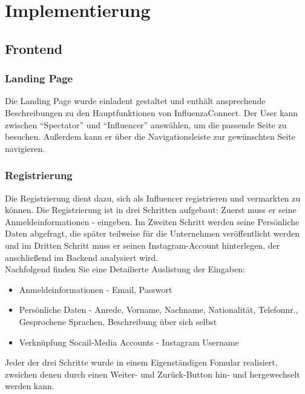 \documentclass[conference,a4paper,flushend]{cs-techrep}
\begin{document}
\section{Implementierung}
\subsection{Frontend}

\subsubsection{Landing Page\\}
Die Landing Page wurde einladent gestaltet und enthält ansprechende Beschreibungen zu den Hauptfunktionen von InfluenzaConnect. Der User kann zwischen ``Spectator'' und ``Influencer'' auswählen, um die passende Seite zu
besuchen. Außerdem kann er über die Navigationsleiste zur gewünschten Seite navigieren.

\subsubsection{Registrierung\\}
Die Registrierung dient dazu, sich als Influencer registrieren und vermarkten zu können. Die Registrierung ist in drei Schritten aufgebaut:
Zuerst muss er seine Anmeldeinformationen - eingeben. Im Zweiten Schritt werden seine Persönliche Daten abgefragt, die später teilweise für die Unternehmen veröffentlicht werden und im Dritten Schritt muss er seinen Instagram-Account hinterlegen, der anschließend im Backend analysiert wird.\\
Nachfolgend finden Sie eine Detailierte Auslistung der Eingaben:
\begin{itemize}
\item{Anmeldeinformationen - Email, Passwort}
\item{Persönliche Daten - Anrede, Vorname, Nachname, Nationalität, Telefonnr., Gesprochene Sprachen, Beschreibung über sich selbst}
\item{Verknüpfung Socail-Media Accounts - Instagram Username}
\end{itemize}
Jeder der drei Schritte wurde in einem Eigenständigen Fomular realisiert, zwsichen denen durch einen Weiter- und Zurück-Button hin- und hergewechselt werden kann.
\end{document}
